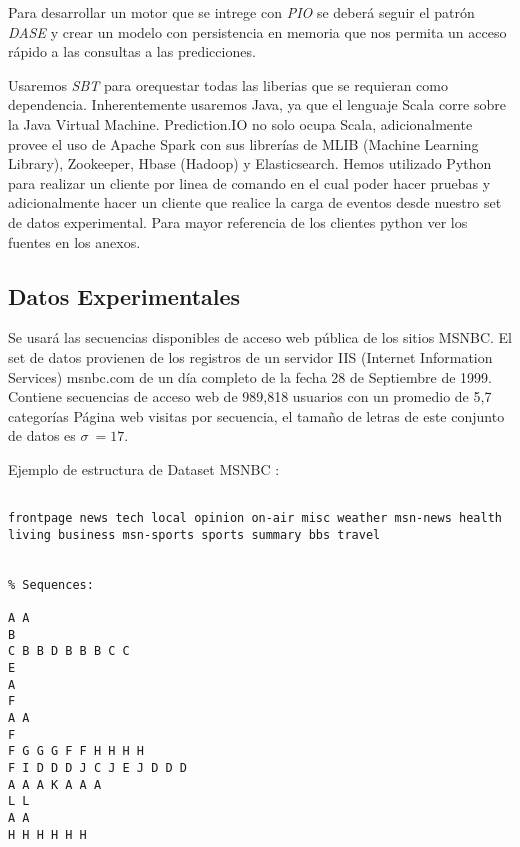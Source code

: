 Para desarrollar un motor que se intrege con \emph{PIO} se deberá seguir el patrón \emph{DASE} y crear un modelo con persistencia en memoria que nos permita un acceso rápido a las consultas a las predicciones.


Usaremos \emph{SBT} para orequestar todas las liberias que se requieran como dependencia. Inherentemente usaremos Java, ya que el lenguaje Scala corre sobre la Java Virtual Machine. Prediction.IO no solo ocupa Scala, adicionalmente provee el uso de Apache Spark con sus librerías de MLIB (Machine Learning Library), Zookeeper, Hbase (Hadoop) y Elasticsearch. Hemos utilizado Python para realizar un cliente por linea de comando en el cual poder hacer pruebas y adicionalmente hacer un cliente que realice la carga de eventos desde nuestro set de datos experimental. Para mayor referencia de los clientes python ver los fuentes en los anexos.





\subsection{Datos Experimentales}

Se usará las secuencias disponibles de acceso web pública de los sitios MSNBC. El set de datos provienen de los registros de un servidor IIS (Internet Information Services) msnbc.com de un día completo de la fecha  28 de Septiembre de 1999. 
Contiene secuencias de acceso web de 989,818 usuarios con un promedio de 5,7  categorías Página web visitas por secuencia, el tamaño de letras de este conjunto de datos es $\sigma \ = 17$.


Ejemplo de estructura de Dataset MSNBC :
\vspace{1cm}

\begin{lstlisting}[frame=single,basicstyle=\ttfamily\tiny,]
% Different categories found in input file:

frontpage news tech local opinion on-air misc weather msn-news health living business msn-sports sports summary bbs travel


% Sequences:

A A 
B 
C B B D B B B C C 
E 
A 
F 
A A 
F 
F G G G F F H H H H 
F I D D D J C J E J D D D 
A A A K A A A 
L L 
A A 
H H H H H H 
\end{lstlisting}





